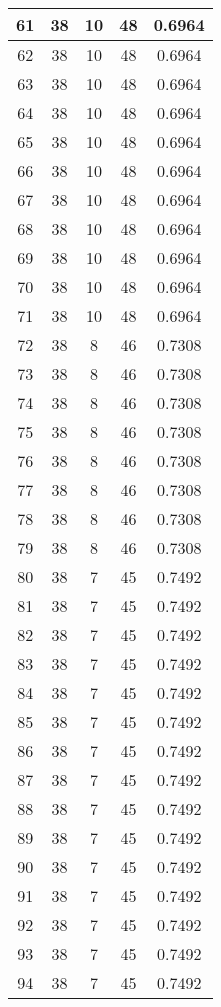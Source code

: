 \documentclass[letterpaper, 12pt]{article}
\begin{document}
\begin{longtable}{|c|c|c|c|c|}
\hline
61 & 38 & 10 & 48 & 0.6964 \\
\hline
62 & 38 & 10 & 48 & 0.6964 \\
\hline
63 & 38 & 10 & 48 & 0.6964 \\
\hline
64 & 38 & 10 & 48 & 0.6964 \\
\hline
65 & 38 & 10 & 48 & 0.6964 \\
\hline
66 & 38 & 10 & 48 & 0.6964 \\
\hline
67 & 38 & 10 & 48 & 0.6964 \\
\hline
68 & 38 & 10 & 48 & 0.6964 \\
\hline
69 & 38 & 10 & 48 & 0.6964 \\
\hline
70 & 38 & 10 & 48 & 0.6964 \\
\hline
71 & 38 & 10 & 48 & 0.6964 \\
\hline
72 & 38 & 8 & 46 & 0.7308 \\
\hline
73 & 38 & 8 & 46 & 0.7308 \\
\hline
74 & 38 & 8 & 46 & 0.7308 \\
\hline
75 & 38 & 8 & 46 & 0.7308 \\
\hline
76 & 38 & 8 & 46 & 0.7308 \\
\hline
77 & 38 & 8 & 46 & 0.7308 \\
\hline
78 & 38 & 8 & 46 & 0.7308 \\
\hline
79 & 38 & 8 & 46 & 0.7308 \\
\hline
80 & 38 & 7 & 45 & 0.7492 \\
\hline
81 & 38 & 7 & 45 & 0.7492 \\
\hline
82 & 38 & 7 & 45 & 0.7492 \\
\hline
83 & 38 & 7 & 45 & 0.7492 \\
\hline
84 & 38 & 7 & 45 & 0.7492 \\
\hline
85 & 38 & 7 & 45 & 0.7492 \\
\hline
86 & 38 & 7 & 45 & 0.7492 \\
\hline
87 & 38 & 7 & 45 & 0.7492 \\
\hline
88 & 38 & 7 & 45 & 0.7492 \\
\hline
89 & 38 & 7 & 45 & 0.7492 \\
\hline
90 & 38 & 7 & 45 & 0.7492 \\
\hline
91 & 38 & 7 & 45 & 0.7492 \\
\hline
92 & 38 & 7 & 45 & 0.7492 \\
\hline
93 & 38 & 7 & 45 & 0.7492 \\
\hline
94 & 38 & 7 & 45 & 0.7492 \\
\hline

\end{longtable}
\end{document}
